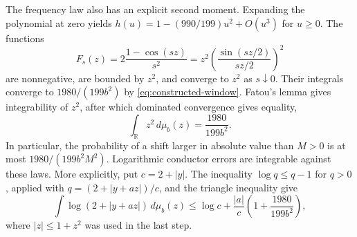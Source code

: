 The frequency law also has an explicit second moment. Expanding the
polynomial at zero yields $h(u)=1-(990/199)u^2+O(u^3)$ for $u\geq0$.
The functions
\[
 F_s(z)=2\frac{1-\cos(sz)}{s^2}
       =z^2\left(\frac{\sin(sz/2)}{sz/2}\right)^2
\]
are nonnegative, are bounded by $z^2$, and converge to $z^2$ as
$s\downarrow0$. Their integrals converge to $1980/(199b^2)$ by
\eqref{eq:constructed-window}. Fatou's lemma gives integrability of
$z^2$, after which dominated convergence gives equality,
\[
 \int_{\mathbb R}z^2\,d\mu_b(z)=\frac{1980}{199b^2}.
\]
In particular, the probability of a shift larger in absolute value
than $M>0$ is at most $1980/(199b^2M^2)$. Logarithmic conductor
errors are integrable against these laws.
More explicitly, put $c=2+|y|$. The inequality $\log q\le q-1$ for
$q>0$, applied with $q=(2+|y+az|)/c$, and the triangle inequality
give
\[
 \int\log(2+|y+az|)\,d\mu_b(z)
 \le \log c+\frac{|a|}{c}\left(1+\frac{1980}{199b^2}\right),
\]
where $|z|\le1+z^2$ was used in the last step.
